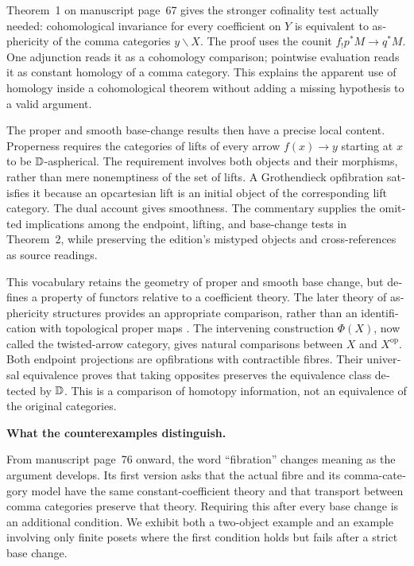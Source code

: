 \begin{otherlanguage}{english}
\begin{otherlanguage}{english}
Theorem~1 on manuscript page~67 gives the stronger cofinality test actually needed: cohomological invariance for every coefficient on $Y$ is equivalent to asphericity of the comma categories $y\backslash X$. The proof uses the counit $f_!p^*M\to q^*M$. One adjunction reads it as a cohomology comparison; pointwise evaluation reads it as constant homology of a comma category. This explains the apparent use of homology inside a cohomological theorem without adding a missing hypothesis to a valid argument.

The proper and smooth base-change results then have a precise local content. Properness requires the categories of lifts of every arrow $f(x)\to y$ starting at $x$ to be $\mathbb{D}$-aspherical. The requirement involves both objects and their morphisms, rather than mere nonemptiness of the set of lifts. A Grothendieck opfibration satisfies it because an opcartesian lift is an initial object of the corresponding lift category. The dual account gives smoothness. The commentary supplies the omitted implications among the endpoint, lifting, and base-change tests in Theorem~2, while preserving the edition's mistyped objects and cross-references as source readings.

This vocabulary retains the geometry of proper and smooth base change, but defines a property of functors relative to a coefficient theory. The later theory of asphericity structures provides an appropriate comparison, rather than an identification with topological proper maps \citep[Theorems~1.2, 4.13, and~5.4]{Maltsiniotis2005Asphericite}. The intervening construction $\Phi(X)$, now called the twisted-arrow category, gives natural comparisons between $X$ and $X^{\mathrm{op}}$. Both endpoint projections are opfibrations with contractible fibres. Their universal equivalence proves that taking opposites preserves the equivalence class detected by $\mathbb{D}$. This is a comparison of homotopy information, not an equivalence of the original categories.

\medskip\noindent\textbf{What the counterexamples distinguish.}

From manuscript page~76 onward, the word ``fibration'' changes meaning as the argument develops. Its first version asks that the actual fibre and its comma-category model have the same constant-coefficient theory and that transport between comma categories preserve that theory. Requiring this after every base change is an additional condition. We exhibit both a two-object example and an example involving only finite posets where the first condition holds but fails after a strict base change.


\end{otherlanguage}
\end{otherlanguage}

